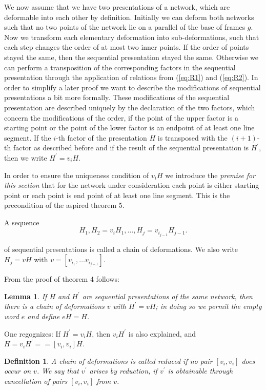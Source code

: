 \documentclass{article}
\newtheorem{lemma}{Lemma}
\newtheorem*{definition}{Definition}
\begin{document}
We now assume that we have two presentations of a network, which are deformable into each other by definition. Initially we can deform both networks such that no two points of the network lie on a parallel of the base of frames $g$. 
Now we transform each elementary deformation into sub-deformations, such that each step changes the order of at most two inner points. 
If the order of points stayed the same, then the sequential presentation stayed the same. 
Otherwise we can perform a transposition of the corresponding factors in the sequential presentation through the application of relations from (\ref{eq:R1}) and (\ref{eq:R2}). 
In order to simplify a later proof we want to describe the modifications of sequential presentations a bit more formally. 
These modifications of the sequential presentation are described uniquely by the declaration of the two factors, which concern the modifications of the order, if the point of the upper factor is a starting point or the point of the lower factor is an endpoint of at least one line segment. 
If the $i$-th factor of the presentation $H$ is transposed with the $(i + 1)$-th factor as described before and if the result of the sequential presentation is $H^{\prime}$, then we write $H^{\prime} = v_{i} H$.

In order to ensure the uniqueness condition of $v_i H$ we introduce the \emph{premise} \emph{for this section} that for the network under consideration each point is either starting point or each point is end point of at least one line segment. 
This is the precondition of the aspired theorem 5.

A sequence 
\[
  H_1, H_2 = v_i H_1, \ldots , H_j = v_{i_{j-1}} H_{j-1}.
\]

of sequential presentations is called a chain of deformations. We also write $H_j = v H$ with $v = [v_{i_1}, \ldots v_{i_{j-1}}]$. 

From the proof of theorem 4 follows:

\begin{lemma}
If $H$ and $H^{\prime}$ are sequential presentations of the same network, then there is a chain of deformations $v$ with $H^{\prime} = v H$; in doing so we permit the empty word $e$ and define $eH = H$.
\end{lemma}

One regognizes: If $H^{\prime} = v_i H$, then $v_i H^{\prime}$ is also explained, and $H = v_i H^{\prime} == [v_i, v_i] H$.

\begin{definition}
A chain of deformations is called \emph{reduced} if no pair $[v_i, v_i]$ does occur on $v$. We say that $v^{\prime}$ arises by reduction, if $v^{\prime}$ is obtainable through cancellation of pairs $[v_i, v_i]$ from $v$.
\end{definition}
\end{document}
